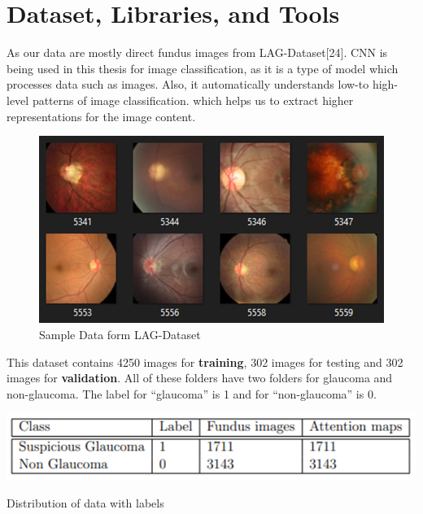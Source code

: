 \section{Dataset, Libraries, and Tools}
As our data are mostly direct fundus images from LAG-Dataset[24]. CNN is being used in this thesis for image classification, as it is a type of model which processes data such as images. Also, it automatically understands low-to high-level patterns of image classification. which helps us to extract higher representations for the image content.

\vspace{5mm}
\begin{figure}[htbp]
\centering
\includegraphics[scale=1]{images/fig-5.png}
\caption{Sample Data form LAG-Dataset}
\label{fig:x Sample Data form LAG-Dataset}
\end{figure}

This dataset contains 4250 images for \textbf{training}, 302 images for testing and 302 images for \textbf{validation}. All of these folders have two folders for glaucoma and non-glaucoma. The label for “glaucoma” is 1 and for “non-glaucoma” is 0.

\vspace{5mm}
\begin{table}[htbp]
\centering
\includegraphics[scale=1]{images/fig-6.png}
\caption{\label{tab:Distribution of data with labels}Distribution of data with labels}

\end{table}

